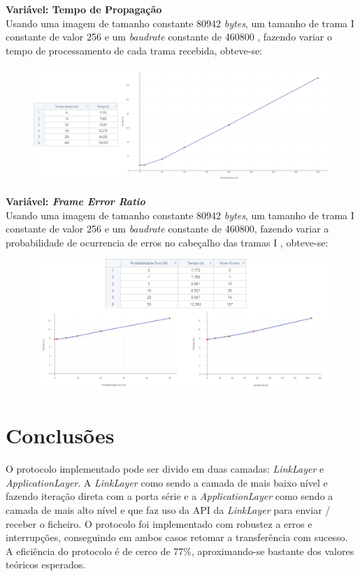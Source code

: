 \documentclass[a4paper, 11pt]{article}
\begin{document}
\textbf{Variável: Tempo de Propagação}\\
Usando uma imagem de tamanho constante 80942 \textit{bytes}, um tamanho de trama I constante de valor 256 e um \textit{baudrate} constante de 460800 , fazendo variar o tempo de processamento de cada trama recebida, obteve-se:
\begin{figure}[h!]
\begin{center}
\includegraphics[scale=0.3]{images/TProp.png}
\end{center}
\end{figure}

\textbf{Variável: \textit{Frame Error Ratio}}\\
Usando uma imagem de tamanho constante 80942 \textit{bytes}, um tamanho de trama I constante de valor 256 e um \textit{baudrate} constante de 460800, fazendo variar a probabilidade de ocurrencia de erros no cabeçalho das tramas I , obteve-se:
\begin{figure}[h!]
\begin{center}
\includegraphics[scale=0.6]{images/FER.png}
\end{center}
\end{figure}


\section{Conclusões}

O protocolo implementado pode ser divido em duas camadas: \textit{LinkLayer} e \textit{ApplicationLayer}. A \textit{LinkLayer} como sendo a camada de mais baixo nível e fazendo iteração direta com a porta série e a \textit{ApplicationLayer} como sendo a camada de mais alto nível e que faz uso da API da \textit{LinkLayer} para enviar / receber o ficheiro. O protocolo foi implementado com robustez a erros e interrupções, conseguindo em ambos casos retomar a transferência com sucesso. A eficiência do protocolo é de cerco de 77\%, aproximando-se bastante dos valores teóricos esperados.
\end{document}
